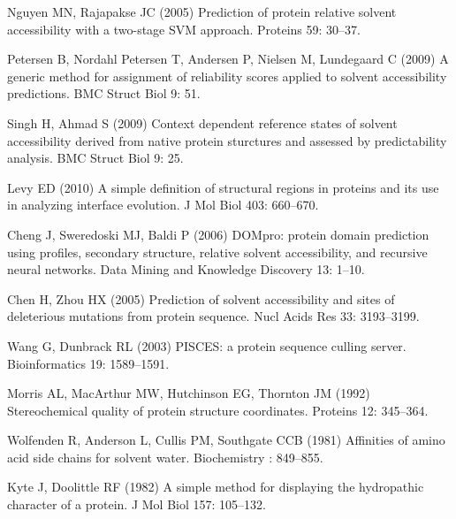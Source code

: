 \documentclass[11pt]{article}
\begin{document}
\begin{thebibliography}{10}
Nguyen MN, Rajapakse JC (2005) Prediction of protein relative solvent
  accessibility with a two-stage {SVM} approach.
\newblock Proteins 59: 30--37.

Petersen B, {Nordahl Petersen} T, Andersen P, Nielsen M, Lundegaard C (2009) A
  generic method for assignment of reliability scores applied to solvent
  accessibility predictions.
\newblock BMC Struct Biol 9: 51.

Singh H, Ahmad S (2009) Context dependent reference states of solvent
  accessibility derived from native protein sturctures and assessed by
  predictability analysis.
\newblock BMC Struct Biol 9: 25.

Levy ED (2010) A simple definition of structural regions in proteins and its
  use in analyzing interface evolution.
\newblock J Mol Biol 403: 660--670.

Cheng J, Sweredoski MJ, Baldi P (2006) {DOMpro:} protein domain prediction
  using profiles, secondary structure, relative solvent accessibility, and
  recursive neural networks.
\newblock Data Mining and Knowledge Discovery 13: 1--10.

Chen H, Zhou HX (2005) Prediction of solvent accessibility and sites of
  deleterious mutations from protein sequence.
\newblock Nucl Acids Res 33: 3193--3199.

Wang G, Dunbrack RL (2003) {PISCES:} a protein sequence culling server.
\newblock Bioinformatics 19: 1589--1591.

Morris AL, MacArthur MW, Hutchinson EG, Thornton JM (1992) Stereochemical
  quality of protein structure coordinates.
\newblock Proteins 12: 345--364.

Wolfenden R, Anderson L, Cullis PM, Southgate CCB (1981) Affinities of amino
  acid side chains for solvent water.
\newblock Biochemistry : 849--855.

Kyte J, Doolittle RF (1982) A simple method for displaying the hydropathic
  character of a protein.
\newblock J Mol Biol 157: 105--132.


\end{thebibliography}
\end{document}
